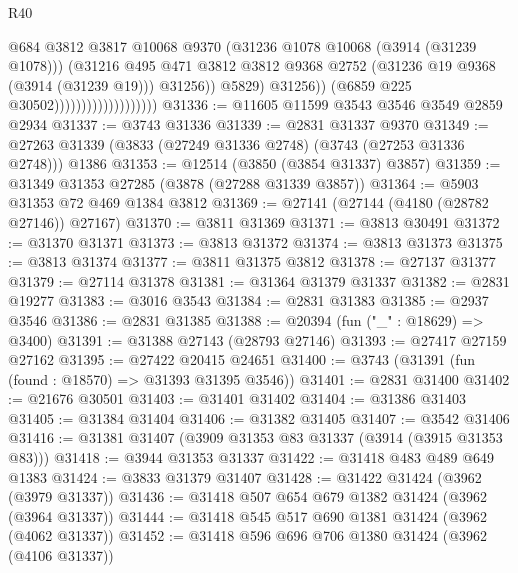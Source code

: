 \begin{lexlean}{R40}
\begin{coremodule}
                                                @684
                                                @3812
                                                @3817
                                                @10068
                                                @9370
                                                (@31236 @1078 @10068 (@3914 (@31239 @1078)))
                                                (@31216
                                                  @495
                                                  @471
                                                  @3812
                                                  @3812
                                                  @9368
                                                  @2752
                                                  (@31236 @19 @9368 (@3914 (@31239 @19)))
                                                  @31256))
                                              @5829)
                                            @31256))
                                        (@6859 @225 @30502)))))))))))))))))))
@31336 := @11605 @11599 @3543 @3546 @3549 @2859 @2934
@31337 := @3743 @31336
@31339 := @2831 @31337 @9370
@31349 := @27263 @31339 (@3833 (@27249 @31336 @2748) (@3743 (@27253 @31336 @2748))) @1386
@31353 := @12514 (@3850 (@3854 @31337) @3857)
@31359 := @31349 @31353 @27285 (@3878 (@27288 @31339 @3857))
@31364 := @5903 @31353 @72 @469 @1384 @3812
@31369 := @27141 (@27144 (@4180 (@28782 @27146)) @27167)
@31370 := @3811 @31369
@31371 := @3813 @30491
@31372 := @31370 @31371
@31373 := @3813 @31372
@31374 := @3813 @31373
@31375 := @3813 @31374
@31377 := @3811 @31375 @3812
@31378 := @27137 @31377
@31379 := @27114 @31378
@31381 := @31364 @31379 @31337
@31382 := @2831 @19277
@31383 := @3016 @3543
@31384 := @2831 @31383
@31385 := @2937 @3546
@31386 := @2831 @31385
@31388 := @20394 (fun ("_" : @18629) => @3400)
@31391 := @31388 @27143 (@28793 @27146)
@31393 := @27417 @27159 @27162
@31395 := @27422 @20415 @24651
@31400 := @3743 (@31391 (fun (found : @18570) => @31393 @31395 @3546))
@31401 := @2831 @31400
@31402 := @21676 @30501
@31403 := @31401 @31402
@31404 := @31386 @31403
@31405 := @31384 @31404
@31406 := @31382 @31405
@31407 := @3542 @31406
@31416 := @31381 @31407 (@3909 @31353 @83 @31337 (@3914 (@3915 @31353 @83)))
@31418 := @3944 @31353 @31337
@31422 := @31418 @483 @489 @649 @1383
@31424 := @3833 @31379 @31407
@31428 := @31422 @31424 (@3962 (@3979 @31337))
@31436 := @31418 @507 @654 @679 @1382 @31424 (@3962 (@3964 @31337))
@31444 := @31418 @545 @517 @690 @1381 @31424 (@3962 (@4062 @31337))
@31452 := @31418 @596 @696 @706 @1380 @31424 (@3962 (@4106 @31337))

\end{coremodule}
\end{lexlean}
